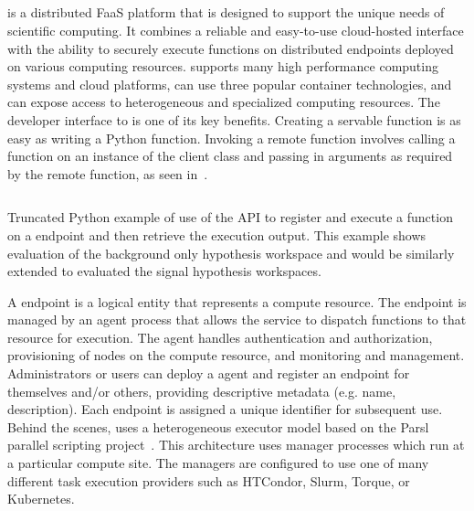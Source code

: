 \subsection{\funcX{}}\label{subsec:funcX}
\funcX{} is a distributed FaaS platform that is designed to support the unique needs of scientific computing.
It combines a reliable and easy-to-use cloud-hosted interface with the ability to securely execute functions on distributed endpoints deployed on various computing resources.
\funcX{} supports many high performance computing systems and cloud platforms, can use three popular container technologies, and can expose access to heterogeneous and specialized computing resources. The developer interface to \funcX{} is one of its key benefits.
Creating a servable function is as easy as writing a Python function.
Invoking a remote function involves calling a function on an instance of the \funcX{} client class and passing in arguments as required by the remote function, as seen in~.

\begin{listing}
 \inputminted{python}{src/code/funcX_registration_example.py}
 \caption{Truncated Python example of use of the \funcX{} API to register and execute a \pyhf{} function on a \funcX{} endpoint and then retrieve the execution output.
 This example shows evaluation of the background only hypothesis workspace and would be similarly extended to evaluated the signal hypothesis workspaces.}
 \label{lst:funcX_registration_example}
\end{listing}

A \funcX{} endpoint is a logical entity that represents a compute resource.
The endpoint is managed by an agent process that allows the \funcX{} service to dispatch functions to that resource for execution.
The agent handles authentication and authorization, provisioning of nodes on the compute resource, and monitoring and management.
Administrators or users can deploy a \funcX{} agent and register an endpoint for themselves and/or others, providing descriptive  metadata (e.g. name, description).
Each endpoint is assigned a unique identifier for subsequent use.\\

Behind the scenes, \funcX{} uses a heterogeneous executor model based on the Parsl parallel scripting project~\cite{Parsl_paper}.
This architecture uses manager processes which run at a particular compute site. The managers are configured to use one of many different task execution providers such as HTCondor, Slurm, Torque, or Kubernetes.\\

